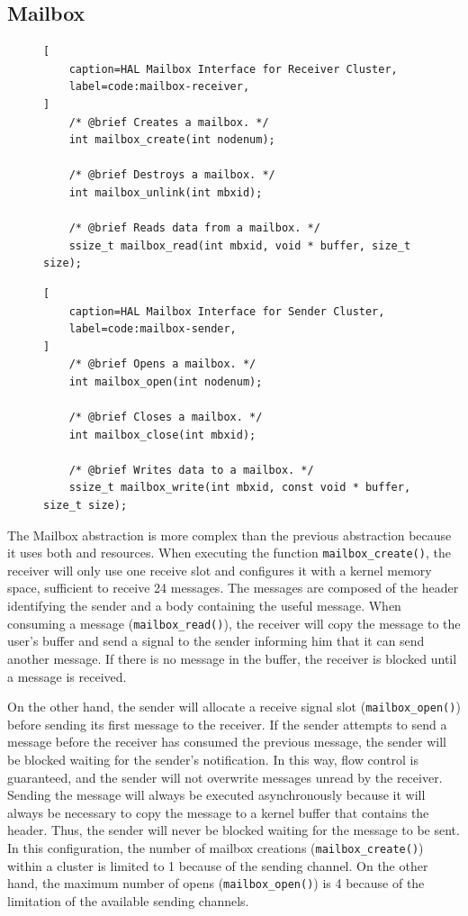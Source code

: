 	\subsection{Mailbox}

\begin{figure}[t]
\begin{lstlisting}[
	caption=HAL Mailbox Interface for Receiver Cluster,
	label=code:mailbox-receiver,
]
	/* @brief Creates a mailbox. */
	int mailbox_create(int nodenum);

	/* @brief Destroys a mailbox. */
	int mailbox_unlink(int mbxid);

	/* @brief Reads data from a mailbox. */
	ssize_t mailbox_read(int mbxid, void * buffer, size_t size);
\end{lstlisting}
\end{figure}

\begin{figure}[t]
\begin{lstlisting}[
	caption=HAL Mailbox Interface for Sender Cluster,
	label=code:mailbox-sender,
]
	/* @brief Opens a mailbox. */
	int mailbox_open(int nodenum);

	/* @brief Closes a mailbox. */
	int mailbox_close(int mbxid);

	/* @brief Writes data to a mailbox. */
	ssize_t mailbox_write(int mbxid, const void * buffer, size_t size);
\end{lstlisting}
\end{figure}

		The Mailbox abstraction is more complex than the previous abstraction
		because it uses both \dnoc and \cnoc resources.
		When executing the function \texttt{mailbox\_create()}, the receiver
		will only use one \dnoc receive slot and configures it with a kernel
		memory space, sufficient to receive 24 messages.
		The messages are composed of the header identifying the sender
		and a body containing the useful message.
		When consuming a message (\texttt{mailbox\_read()}), the receiver
		will copy the message to the user's buffer and send a signal
		to the sender informing him that it can send another message.
		If there is no message in the buffer, the receiver is blocked
		until a message is received.

		On the other hand, the sender will allocate a receive signal slot (\texttt{mailbox\_open()})
		before sending its first message to the receiver.
		If the sender attempts to send a message before the receiver has consumed
		the previous message, the sender will be blocked waiting for the sender's notification.
		In this way, flow control is guaranteed, and the sender will not overwrite
		messages unread by the receiver.
		Sending the message will always be executed asynchronously
		because it will always be necessary to copy the message to
		a kernel buffer that contains the header.
		Thus, the sender will never be blocked waiting for the message to be sent.
		In this configuration, the number of mailbox creations (\texttt{mailbox\_create()})
		within a cluster is limited to 1 because of the \cnoc sending channel.
		On the other hand, the maximum number of opens (\texttt{mailbox\_open()}) is
		4 because of the limitation of the available \dnoc sending channels.

